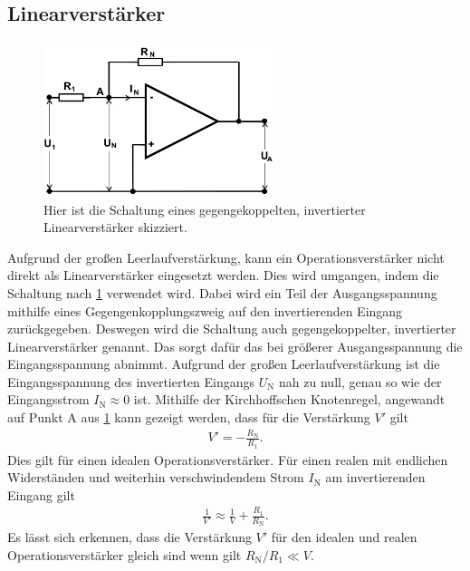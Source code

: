 \subsection{Linearverstärker}
\begin{figure}[h!]
	\centering
	\includegraphics[width = 0.6\textwidth]{../Grafiken/Gegengekoppelter_Invertierter_Liniearverstaerker.png}
	\caption{Hier ist die Schaltung eines gegengekoppelten, invertierter Linearverstärker skizziert. \cite{V51}\label{fig:gegen_gekoppelter_invertierter_Linarverstärker}}
\end{figure}
\noindent
Aufgrund der großen Leerlaufverstärkung, kann ein Operationsverstärker nicht direkt als Linearverstärker eingesetzt werden.
Dies wird umgangen, indem die Schaltung nach \cref{fig:gegen_gekoppelter_invertierter_Linarverstärker} verwendet wird.
Dabei wird ein Teil der Ausgangsspannung mithilfe eines Gegengenkopplungszweig auf den invertierenden Eingang zurückgegeben.
Deswegen wird die Schaltung auch gegengekoppelter, invertierter Linearverstärker genannt.
Das sorgt dafür das bei größerer Ausgangsspannung die Eingangsspannung abnimmt.
Aufgrund der großen Leerlaufverstärkung ist die Eingangsspannung des invertierten Eingangs $U_\text{N}$ nah zu null, genau so wie der Eingangsstrom $I_\text{N}\approx0$ ist.
Mithilfe der Kirchhoffschen Knotenregel, angewandt auf Punkt A aus \cref{fig:gegen_gekoppelter_invertierter_Linarverstärker} kann gezeigt werden, dass für die Verstärkung $V'$ gilt
\begin{align}
	V' = -\frac{R_\text{N}}{R_1}.
	\label{eq:gegengekoppelt_verstaerkung}
\end{align}
Dies gilt für einen idealen Operationsverstärker.
Für einen realen mit endlichen Widerständen und weiterhin verschwindendem Strom $I_\text{N}$ am invertierenden Eingang gilt 
\begin{align}
	\frac{1}{V'}\approx\frac{1}{V}+\frac{R_1}{R_\text{N}}.
	\label{eq:leerlauf_verstaerkung}
\end{align}
Es lässt sich erkennen, dass die Verstärkung $V'$ für den idealen und realen Operationsverstärker gleich sind wenn gilt $R_\text{N}/R_1\ll V$.

